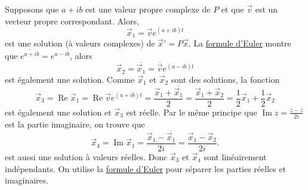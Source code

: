 Supposons que $a + ib$ est une valeur propre complexe de $P$ et que $\vec{v}$
est un vecteur propre correspondant. Alors, 
\begin{equation*}
\vec{x}_1 = \vec{v} e^{(a+ib)t}
\end{equation*}
est une solution (à valeurs complexes) de
${\vec{x}}' = P \vec{x}$. La \hyperref[eulersformula]{formule d’Euler} montre que
$\overline{e^{a+ib}} =
e^{a-ib}$,
alors
\begin{equation*}
\vec{x}_2 = \overline{\vec{x}_1} = \overline{\vec{v}} e^{(a-ib)t}
\end{equation*}
est également une solution. Comme $\vec{x}_1$ et $\vec{x}_2$ sont des solutions, la fonction
\begin{equation*}
\vec{x}_3 =
\operatorname{Re} \vec{x}_1 =
\operatorname{Re} \vec{v} e^{(a+ib)t} =
\frac{\vec{x}_1 + \overline{\vec{x}_1}}{2}  =
\frac{\vec{x}_1 + \vec{x}_2}{2} 
=
\frac{1}{2} \vec{x}_1 + \frac{1}{2}\vec{x}_2
\end{equation*}
est également une solution et $\vec{x}_3$ est réelle. Par le même principe que
$\operatorname{Im} z = \frac{z-\bar{z}}{2i}$ est la partie imaginaire, on trouve que
\begin{equation*}
\vec{x}_4 =
\operatorname{Im} \vec{x}_1 =
\frac{\vec{x}_1 - \overline{\vec{x}_1}}{2i}  =
\frac{\vec{x}_1 - \vec{x}_2}{2i} .
\end{equation*}
est aussi une solution à valeurs réelles. Donc $\vec{x}_3$ et
$\vec{x}_4$ sont linéairement indépendants. On utilise la \hyperref[eulersformula]{formule d'Euler} pour séparer les parties réelles et imaginaires.

\medskip

